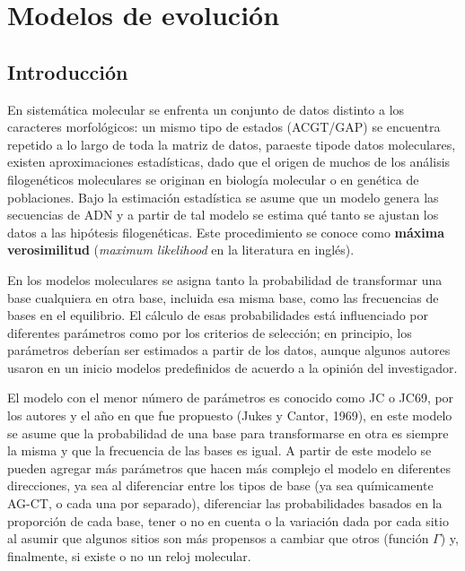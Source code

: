 %
%
\chapter{Modelos de evoluci\'on}


\section*{Introducci\'on}

\label{ch:molecular}
En sistem\'atica molecular se enfrenta un conjunto de datos distinto  a los caracteres morfol\'ogicos:  un mismo tipo de estados (ACGT/GAP) se encuentra repetido a lo largo de toda la matriz de datos, paraeste tipode datos moleculares, existen aproximaciones estad\'isticas, dado que el origen de muchos de los an\'alisis filogen\'eticos moleculares se originan en biolog\'ia molecular o en gen\'etica de poblaciones. Bajo la estimaci\'on estad\'istica se asume que un modelo genera las secuencias de ADN y a partir de tal modelo se estima qu\'e tanto se ajustan los datos a las hip\'otesis filogen\'eticas. Este procedimiento se conoce como \textbf{m\'axima verosimilitud} (\textit{maximum likelihood} en la literatura en ingl\'es).

En los modelos moleculares se asigna tanto la probabilidad de transformar una base cualquiera en otra base, incluida esa misma base, como las frecuencias de bases en el equilibrio. El c\'alculo de esas probabilidades est\'a influenciado por diferentes par\'ametros como por los criterios de selecci\'on; en principio, los par\'ametros deber\'ian ser estimados a partir  de los datos, aunque algunos autores usaron en un inicio modelos predefinidos de acuerdo a la opini\'on del investigador.

El modelo con el menor n\'umero de par\'ametros es conocido como JC o JC69, por los autores y el a\~no en que fue propuesto (Jukes y Cantor, 1969), en este modelo se asume que la probabilidad de una base para transformarse en otra es siempre la misma y que la frecuencia de las bases es igual. A partir de este modelo se pueden agregar m\'as par\'ametros que hacen m\'as complejo el modelo en diferentes direcciones, ya sea al diferenciar entre los tipos de base (ya sea qu\'imicamente AG-CT, o cada una por separado), diferenciar las probabilidades basados en la proporci\'on de cada base, tener o no en cuenta o la variaci\'on dada por cada sitio al asumir que algunos sitios son m\'as propensos a cambiar que otros (funci\'on $\Gamma$) y, finalmente, si existe o no un reloj molecular.

